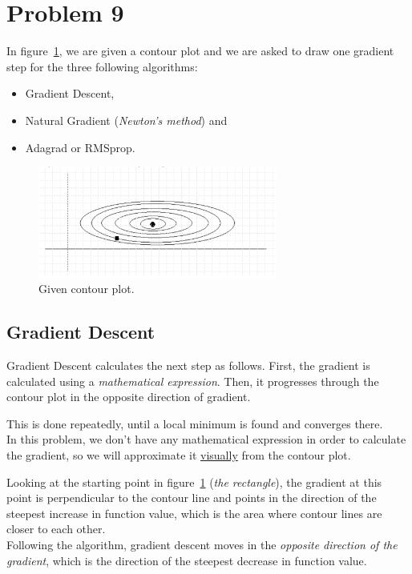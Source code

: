 \section{Problem 9}

In figure~\ref{fig:prob9_given_contour_plot}, we are given a contour plot and we are asked to draw one gradient step for the three following algorithms:
\begin{itemize}
	\item Gradient Descent,
	\item Natural Gradient (\textit{Newton's method}) and
	\item Adagrad or RMSprop.
\end{itemize}

\begin{figure}[htpb]
	\centering
	\includegraphics[width=0.7\textwidth]{../Problem 9/contour_plot.png}
	\caption{Given contour plot.}
	\label{fig:prob9_given_contour_plot}
\end{figure}

\subsection{Gradient Descent}

Gradient Descent calculates the next step as follows. First, the gradient is calculated using a \textit{mathematical expression}. Then, it progresses through the contour plot in the opposite direction of gradient.

This is done repeatedly, until a local minimum is found and converges there.\\

In this problem, we don't have any mathematical expression in order to calculate the gradient, so we will approximate it \underline{visually} from the contour plot.

Looking at the starting point in figure~\ref{fig:prob9_given_contour_plot} (\textit{the rectangle}), 
the gradient at this point is perpendicular to the contour line and points in the direction of the steepest increase in function value, which is the area where contour lines are closer to each other.\\
Following the algorithm, gradient descent moves in the \textit{opposite direction of the gradient}, which is the direction of the steepest decrease in function value.

